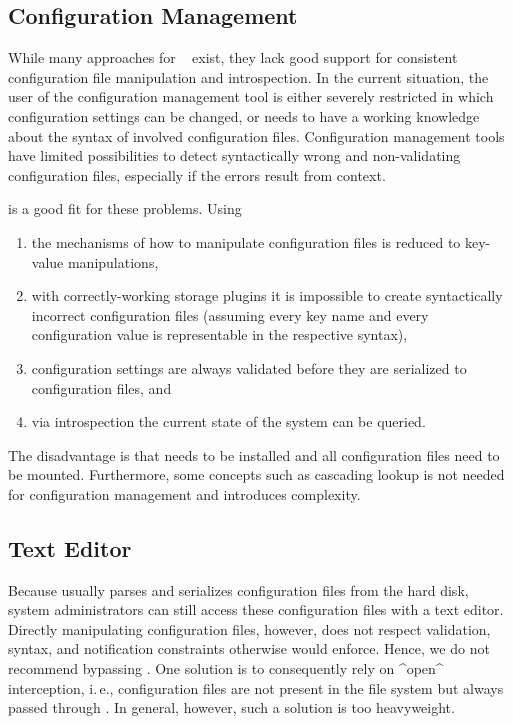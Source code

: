 \subsection{Configuration Management}

While many approaches for ~\cite{cons2002pan,huang2015confvalley} exist, they lack good support for consistent configuration file manipulation and introspection.
In the current situation, the user of the configuration management tool is either severely restricted in which configuration settings can be changed, or needs to have a working knowledge about the syntax of involved configuration files.
Configuration management tools have limited possibilities to detect syntactically wrong and non-validating configuration files, especially if the errors result from context.

\elektra{} is a good fit for these problems. Using \elektra{}
\begin{enumerate}
\item
the mechanisms of how to manipulate configuration files is reduced to key-value manipulations,
\item
with correctly-working storage plugins it is impossible to create syntactically incorrect configuration files (assuming every key name and every configuration value is representable in the respective syntax),
\item
configuration settings are always validated before they are serialized to configuration files, and
\item
via introspection the current state of the system can be queried.
\end{enumerate}

The disadvantage is that \elektra{} needs to be installed and all configuration files need to be mounted.
Furthermore, some concepts such as cascading lookup is not needed for configuration management and introduces complexity.



\subsection{Text Editor}


Because \elektra{} usually parses and serializes configuration files from the hard disk, system administrators can still access these configuration files with a text editor.
Directly manipulating configuration files, however, does not respect validation, syntax, and notification constraints \elektra{} otherwise would enforce.
Hence, we do not recommend bypassing \elektra{}.
One solution is to consequently rely on ^open^ interception, i.\,e., configuration files are not present in the file system but always passed through \elektra{}.
In general, however, such a solution is too heavyweight.

